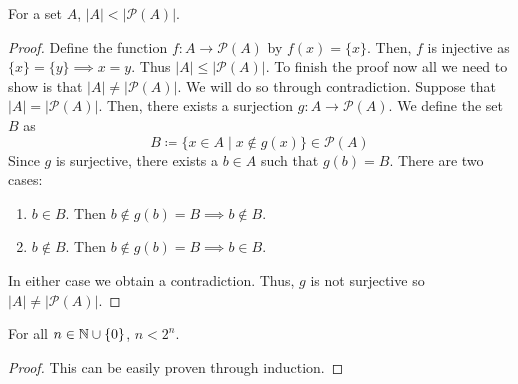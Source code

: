\begin{theorem}[Cantor]
For a set $A$, $|A|<|\mathcal{P}(A)|$.
\end{theorem}
\begin{proof}
Define the function $f:A \to \mathcal{P}(A)$ by $f(x) = \{x\}$. Then, $f$ is injective as $\{x\}=\{y\} \implies x=y$. Thus $|A| \le |\mathcal{P}(A)|$. To finish the proof now all we need to show is that $|A| \neq |\mathcal{P}(A)|$. We will do so through contradiction. Suppose that $|A| = |\mathcal{P}(A)|$. Then, there exists a surjection $g:A \to \mathcal{P}(A)$. We define the set $B$ as
\[ B \coloneq \{x \in A \mid x \notin g(x)\} \in \mathcal{P}(A) \]
Since $g$ is surjective, there exists a $b \in A$ such that $g(b) = B$. There are two cases:
\begin{enumerate}
\item $b \in B$. Then $b \notin g(b) = B \implies b \notin B$.
\item $b \notin B$. Then $b \notin g(b) = B \implies b \in B$.
\end{enumerate}
In either case we obtain a contradiction. Thus, $g$ is not surjective so $|A| \neq |\mathcal{P}(A)|$.
\end{proof}

\begin{corollary}
For all $n \in \mathbb N \cup \{0\}$, $n<2^n$.
\end{corollary}
\begin{proof}
This can be easily proven through induction.
\end{proof}
\pagebreak

